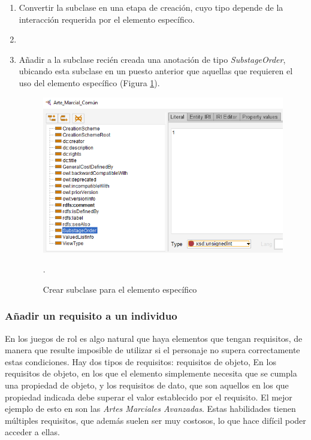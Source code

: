 \begin{enumerate}
    \item Convertir la subclase en una etapa de creación, cuyo tipo depende de la interacción requerida por el elemento específico.
    \item \item Añadir a la subclase recién creada una anotación de tipo \textit{SubstageOrder}, ubicando esta subclase en un puesto 
    anterior que aquellas que requieren el uso del elemento específico (Figura \ref*{ElementoComun_2}).
    \begin{figure}[H]
        \centering
        \includegraphics[scale=0.6]{Figures/Protege/ElementoComun_2.png}
        \caption{Crear subclase para el elemento específico}.
        \label{ElementoComun_2}
    \end{figure}

\end{enumerate}

\subsubsection{Añadir un requisito a un individuo}
En los juegos de rol es algo natural que haya elementos que tengan requisitos, de manera que resulte imposible de utilizar si 
el personaje no supera correctamente estas condiciones. Hay dos tipos de requisitos: requisitos de objeto, En los requisitos de objeto, 
en los que el elemento simplemente necesita que se cumpla una propiedad de objeto, y los requisitos de dato, que son aquellos en los que 
propiedad indicada debe superar el valor establecido por el requisito. El mejor ejemplo de esto en \anima son las 
\textit{Artes Marciales Avanzadas}. Estas habilidades tienen múltiples requisitos, que además suelen ser muy costosos, 
lo que hace difícil poder acceder a ellas. \medskip 

